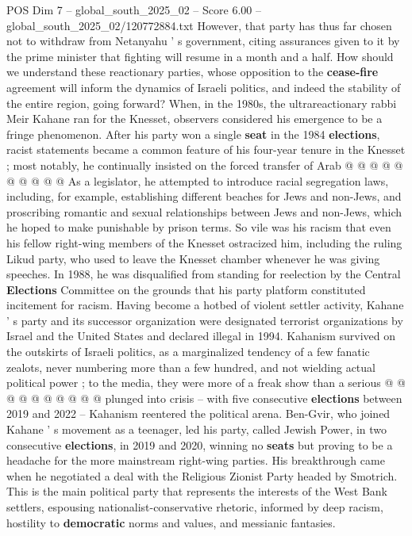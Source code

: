 \begin{textsample}{POS Dim 7 – global\_south\_2025\_02 – Score 6.00 – global\_south\_2025\_02/120772884.txt}
However, that party has thus far chosen not to withdraw from Netanyahu ' s government, citing assurances given to it by the prime minister that fighting will resume in a month and a half.
How should we understand these reactionary parties, whose opposition to the \textbf{cease-fire} agreement will inform the dynamics of Israeli politics, and indeed the stability of the entire region, going forward?
When, in the 1980s, the ultrareactionary rabbi Meir Kahane ran for the Knesset, observers considered his emergence to be a fringe phenomenon.
After his party won a single \textbf{seat} in the 1984 \textbf{elections}, racist statements became a common feature of his four-year tenure in the Knesset ; most notably, he continually insisted on the forced transfer of Arab @ @ @ @ @ @ @ @ @ @ As a legislator, he attempted to introduce racial segregation laws, including, for example, establishing different beaches for Jews and non-Jews, and proscribing romantic and sexual relationships between Jews and non-Jews, which he hoped to make punishable by prison terms.
So vile was his racism that even his fellow right-wing members of the Knesset ostracized him, including the ruling Likud party, who used to leave the Knesset chamber whenever he was giving speeches.
In 1988, he was disqualified from standing for reelection by the Central \textbf{Elections} Committee on the grounds that his party platform constituted incitement for racism.
Having become a hotbed of violent settler activity, Kahane ' s party and its successor organization were designated terrorist organizations by Israel and the United States and declared illegal in 1994.
Kahanism survived on the outskirts of Israeli politics, as a marginalized tendency of a few fanatic zealots, never numbering more than a few hundred, and not wielding actual political power ; to the media, they were more of a freak show than a serious @ @ @ @ @ @ @ @ @ @ plunged into crisis -- with five consecutive \textbf{elections} between 2019 and 2022 -- Kahanism reentered the political arena.
Ben-Gvir, who joined Kahane ' s movement as a teenager, led his party, called Jewish Power, in two consecutive \textbf{elections}, in 2019 and 2020, winning no \textbf{seats} but proving to be a headache for the more mainstream right-wing parties.
His breakthrough came when he negotiated a deal with the Religious Zionist Party headed by Smotrich.
This is the main political party that represents the interests of the West Bank settlers, espousing nationalist-conservative rhetoric, informed by deep racism, hostility to \textbf{democratic} norms and values, and messianic fantasies.

\end{textsample}
